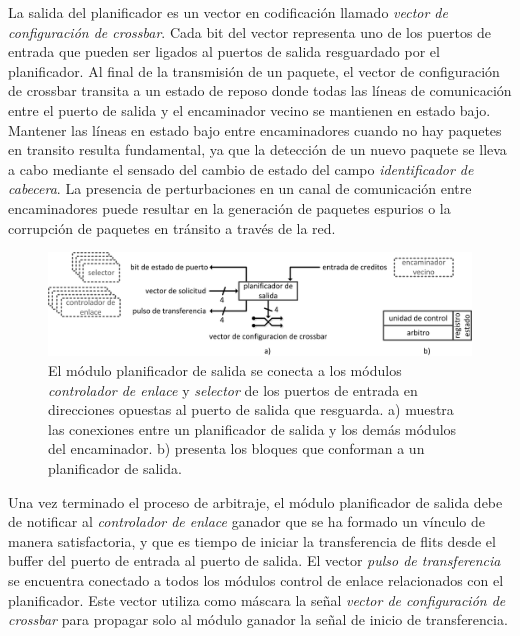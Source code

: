La salida del planificador es un vector en codificación  llamado \textit{vector de configuración de crossbar}. Cada bit del vector representa uno de los puertos de entrada que pueden ser ligados al puertos de salida resguardado por el planificador. Al final de la transmisión de un paquete, el vector de configuración de crossbar transita a un estado de reposo donde todas las líneas de comunicación entre el puerto de salida y el encaminador vecino se mantienen en estado bajo. Mantener las líneas en estado bajo entre encaminadores cuando no hay paquetes en transito resulta fundamental, ya que la detección de un nuevo paquete se lleva a cabo mediante el sensado del cambio de estado del campo \textit{identificador de cabecera}. La presencia de perturbaciones en un canal de comunicación entre encaminadores puede resultar en la generación de paquetes espurios o la corrupción de paquetes en tránsito a través de la red.

\begin{figure}
	\includegraphics[width=\linewidth]{figures/ch4_planificador_de_salida_top.png}
	\caption
		{	
			El módulo planificador de salida se conecta a los módulos \textit{controlador de enlace} y \textit{selector} de los puertos de entrada en direcciones opuestas al puerto de salida que resguarda. a) muestra las conexiones entre un planificador de salida y los demás módulos del encaminador. b) presenta los bloques que conforman a un planificador de salida.
		}
	\label{fig:ch4_planificador_de_salida_top}
\end{figure}

Una vez terminado el proceso de arbitraje, el módulo planificador de salida debe de notificar al \textit{controlador de enlace} ganador que se ha formado un vínculo de manera satisfactoria, y que es tiempo de iniciar la transferencia de flits desde el buffer del puerto de entrada al puerto de salida. El vector \textit{pulso de transferencia} se encuentra conectado a todos los módulos control de enlace relacionados con el planificador. Este vector utiliza como máscara la señal \textit{vector de configuración de crossbar} para propagar solo al módulo ganador la señal de inicio de transferencia.



